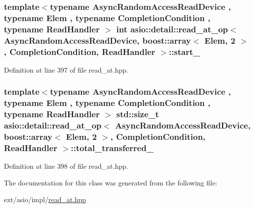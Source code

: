 \subsubsection[{start\+\_\+}]{\setlength{\rightskip}{0pt plus 5cm}template$<$typename Async\+Random\+Access\+Read\+Device , typename Elem , typename Completion\+Condition , typename Read\+Handler $>$ int {\bf asio\+::detail\+::read\+\_\+at\+\_\+op}$<$ Async\+Random\+Access\+Read\+Device, {\bf boost\+::array}$<$ Elem, 2 $>$,                           Completion\+Condition, Read\+Handler $>$\+::start\+\_\+}\label{classasio_1_1detail_1_1read__at__op_3_01_async_random_access_read_device_00_01boost_1_1array_3_00756f1b0c223a71b75bb1b3f8c0f0e31_a53d4dd2229b6dee78906cdc98a7a007e}


Definition at line 397 of file read\+\_\+at.\+hpp.

\hypertarget{classasio_1_1detail_1_1read__at__op_3_01_async_random_access_read_device_00_01boost_1_1array_3_00756f1b0c223a71b75bb1b3f8c0f0e31_a67f2136b93643478d60eed159f4e172e}{}
\subsubsection[{total\+\_\+transferred\+\_\+}]{\setlength{\rightskip}{0pt plus 5cm}template$<$typename Async\+Random\+Access\+Read\+Device , typename Elem , typename Completion\+Condition , typename Read\+Handler $>$ std\+::size\+\_\+t {\bf asio\+::detail\+::read\+\_\+at\+\_\+op}$<$ Async\+Random\+Access\+Read\+Device, {\bf boost\+::array}$<$ Elem, 2 $>$,                           Completion\+Condition, Read\+Handler $>$\+::total\+\_\+transferred\+\_\+}\label{classasio_1_1detail_1_1read__at__op_3_01_async_random_access_read_device_00_01boost_1_1array_3_00756f1b0c223a71b75bb1b3f8c0f0e31_a67f2136b93643478d60eed159f4e172e}


Definition at line 398 of file read\+\_\+at.\+hpp.



The documentation for this class was generated from the following file\+:\begin{DoxyCompactItemize}
\item 
ext/asio/impl/\hyperlink{impl_2read__at_8hpp}{read\+\_\+at.\+hpp}\end{DoxyCompactItemize}
